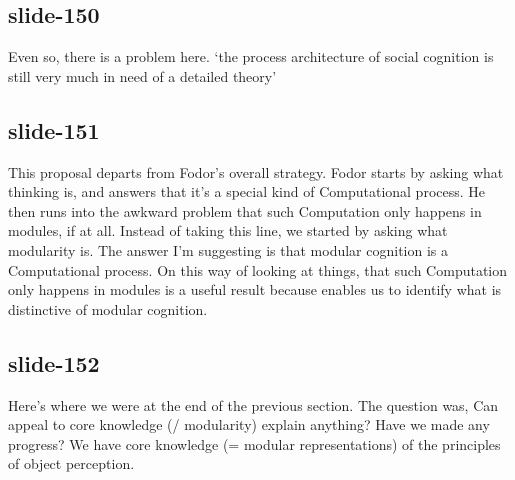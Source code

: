 \documentclass[12pt,\papersize]{extarticle}
\begin{document}
 
\subsection{slide-150}
Even so, there is a problem here.
‘the process architecture of social cognition is still very much in need of a detailed theory’
\citep[p.\ 759]{adolphs_conceptual_2010}
 
 
\subsection{slide-151}
This proposal departs from Fodor's overall strategy. Fodor starts by asking what thinking is, and answers that it's a special kind of Computational process. He then runs into the awkward problem that such Computation only happens in modules, if at all. Instead of taking this line, we started by asking what modularity is. The answer I'm suggesting is that modular cognition is a Computational process. On this way of looking at things, that such Computation only happens in modules is a useful result because enables us to identify what is distinctive of modular cognition.
 
 
\subsection{slide-152}
Here's where we were at the end of the previous section.
The question was, Can appeal to core knowledge (/ modularity) explain anything?
Have we made any progress?
We have core knowledge (= modular representations) of the principles of object perception.
 
 
\end{document}
